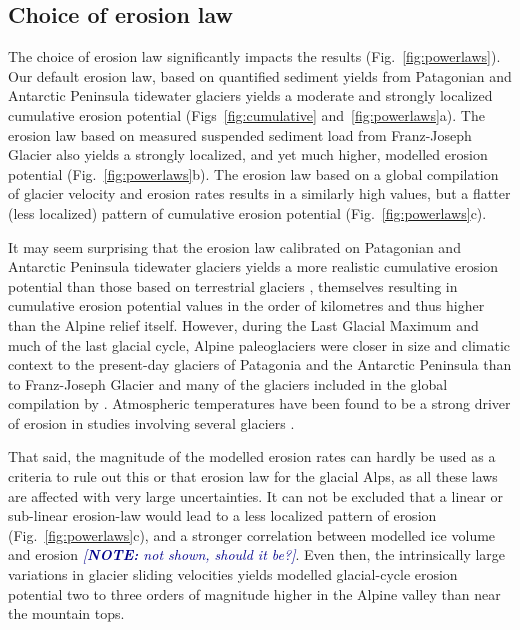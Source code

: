 \documentclass[utf8]{article}
\newcommand{\note}[1]{\textcolor{darkblue}{\emph{[\textbf{NOTE:} #1]}}}
\begin{document}
\subsection{Choice of erosion law}
\label{sec:powerlaws}

    The choice of erosion law significantly impacts the results
    (Fig.~\ref{fig:powerlaws}). Our default erosion law, based on quantified
    sediment yields from Patagonian and Antarctic Peninsula tidewater glaciers
    \citep[${\dot{e}=5.2\times10^{-8}u_\mathrm{b}^{2.34}}$,][]{Koppes.etal.2015}
    yields a moderate and strongly localized cumulative erosion potential
    (Figs~\ref{fig:cumulative} and~\ref{fig:powerlaws}a). The erosion law
    based on measured suspended sediment load from Franz-Joseph Glacier
    \citep[${\dot{e}=2.7\times10^{-7}u_\mathrm{b}^{2.02}}$,][]{Herman.etal.2015}
    also yields a strongly localized, and yet much higher, modelled erosion
    potential (Fig.~\ref{fig:powerlaws}b). The erosion law based on a global
    compilation of glacier velocity and erosion rates
    \citep[${\dot{e}=1.665\times10^{-1}u_\mathrm{b}^{0.6459}}$,][]{Cook.etal.2020}
    results in a similarly high values, but a flatter (less localized) pattern
    of cumulative erosion potential (Fig.~\ref{fig:powerlaws}c).

    It may seem surprising that the erosion law calibrated on Patagonian and
    Antarctic Peninsula tidewater glaciers \citep{Koppes.etal.2015} yields a
    more realistic cumulative erosion potential than those based on terrestrial
    glaciers \citep{Herman.etal.2015, Cook.etal.2020}, themselves resulting
    in cumulative erosion potential values in the order of kilometres and thus
    higher than the Alpine relief itself. However, during the Last Glacial
    Maximum and much of the last glacial cycle, Alpine paleoglaciers were
    closer in size and climatic context to the present-day glaciers of
    Patagonia and the Antarctic Peninsula \citep{Koppes.etal.2015} than to
    Franz-Joseph Glacier \citep{Herman.etal.2015} and many of the glaciers
    included in the global compilation by \citet{Cook.etal.2020}. Atmospheric
    temperatures have been found to be a strong driver of erosion in studies
    involving several glaciers \citep{Koppes.etal.2015, Cook.etal.2020}.

    That said, the magnitude of the modelled erosion rates can hardly be used
    as a criteria to rule out this or that erosion law for the glacial Alps, as
    all these laws are affected with very large uncertainties. It can not be
    excluded that a linear or sub-linear erosion-law
    \citep[e.g.][]{Cook.etal.2020} would lead to a less localized pattern of
    erosion (Fig.~\ref{fig:powerlaws}c), and a stronger correlation between
    modelled ice volume and erosion \note{not shown, should it be?}. Even
    then, the intrinsically large variations in glacier sliding velocities
    yields modelled glacial-cycle erosion potential two to three orders of
    magnitude higher in the Alpine valley than near the mountain tops.
\end{document}
